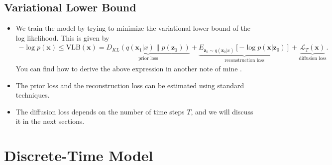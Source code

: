 \documentclass[10pt]{article}
\newcommand{\ve}[1]{\mathbf{#1}}
\newcommand{\mrm}[1]{\mathrm{#1}}
\newcommand{\mcal}[1]{\mathcal{#1}}
\begin{document}
\subsection{Variational Lower Bound}

\begin{itemize}
  \item We train the model by trying to minimize the variational lower bound of the log likelihood. This is given by
  \begin{align*}
    -\log p(\ve{x})
    \leq \mrm{VLB}(\ve{x})
    = \underbrace{D_{KL}(q(\ve{x}_1|x) \| p(\ve{z_1}))}_{\mbox{prior loss}}
    + \underbrace{E_{\ve{z}_0 \sim q(\ve{z}_0|x)}[-\log p(\ve{x}|\ve{z}_0)]}_{\mbox{reconstruction loss}}
    + \underbrace{\mcal{L}_T(\ve{x})}_{\mbox{diffusion loss}}.
  \end{align*}
  You can find how to derive the above expression in another note of mine \cite{Khungurn:2022b}.

  \item The prior loss and the reconstruction loss can be estimated using standard techniques.
  
  \item The diffusion loss depends on the number of time steps $T$, and we will discuss it in the next sections.
\end{itemize}

\section{Discrete-Time Model}
\end{document}
